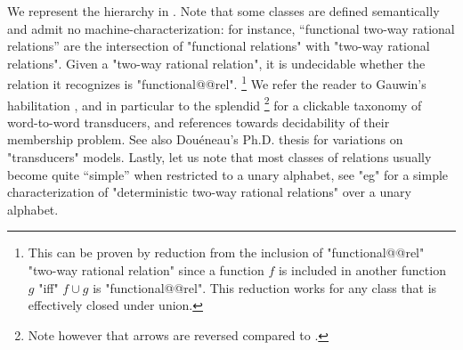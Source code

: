 We represent the hierarchy in .
Note that some classes are defined semantically and admit no machine-characterization:
for instance, ``functional two-way rational relations'' are the intersection
of "functional relations" with  "two-way rational relations".
Given a "two-way rational relation", it is undecidable whether the relation it
recognizes is "functional@@rel".%
\footnote{This can be proven by reduction from the inclusion of "functional@@rel" "two-way rational relation" since a function $f$ is included in another function $g$
"iff" $f\cup g$ is "functional@@rel". This reduction works for any class that
is effectively closed under union.}
We refer the reader to
Gauwin's habilitation \cite{Gauwin2020Transductions}, and in particular
to the splendid \cite[Figure~2.1, p.~16]{Gauwin2020Transductions}%
\footnote{Note however that arrows are reversed compared to
.}
for a clickable taxonomy of word-to-word transducers, and references towards
decidability of their membership problem.
See also Douéneau's Ph.D. thesis \cite[\S~1]{Douéneau2023PhD} for variations on
"transducers" models.
Lastly, let us note that most classes of relations usually become quite ``simple'' when restricted 
to a unary alphabet, see "eg" \cite[Theorem~1]{ChoffrutGuillon2014UnaryTransducers} for a simple
characterization of "deterministic two-way rational relations" over a unary alphabet.